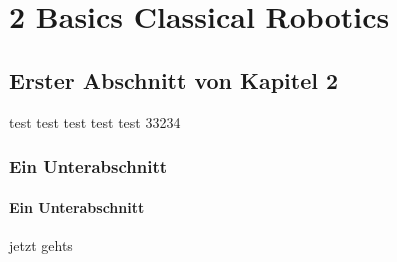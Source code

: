 \chapter{2	Basics Classical Robotics}

\section{Erster Abschnitt von Kapitel 2}
test test test test
test 33234
\subsection{Ein Unterabschnitt}
\subsubsection{Ein Unterabschnitt}
jetzt gehts
